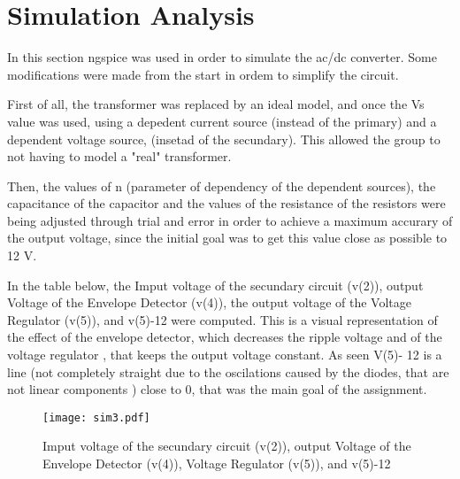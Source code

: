 \section{Simulation Analysis}\label{section:sim}
 In this section ngspice was used in order to simulate the ac/dc converter. Some modifications were made from the start in ordem to simplify the circuit.
 
 First of all, the transformer was replaced by an ideal model, and once the Vs value was used, using a depedent current source (instead of the primary) and a dependent voltage source, (insetad of the secundary). This allowed the group to not having to model a "real" transformer. 
 
Then, the values of n (parameter of dependency of the dependent sources), the capacitance of the capacitor and the values of the resistance of the resistors were being adjusted through trial and error in order to achieve a maximum accurary of the output voltage, since the initial goal was to get this value close as possible to 12 V.


In the table below, the Imput voltage of the secundary circuit (v(2)), output Voltage of the Envelope Detector (v(4)), the output voltage of the  Voltage Regulator (v(5)), and v(5)-12 were computed. This is a visual representation of the effect of the envelope detector, which decreases the ripple voltage and of the voltage regulator , that keeps the output voltage constant. As seen V(5)- 12 is a line (not completely straight due to the oscilations caused by the diodes, that are not linear components ) close to 0, that was the main goal of the assignment.

\begin{figure}[h] \centering
\texttt{[image: sim3.pdf]}
\caption{Imput voltage of the secundary circuit (v(2)), output Voltage of the Envelope Detector (v(4)), Voltage Regulator (v(5)), and v(5)-12}
\label{fig:sim5}
\end{figure}





